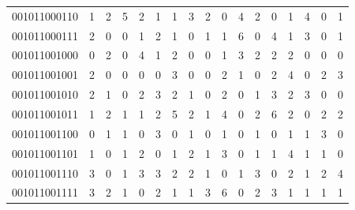 \documentclass[10pt,a4paper]{article}
\begin{document}
\begin{longtable}{ |c|c|c|c|c|c|c|c|c|c|c|c|c|c|c|c|c| }
    001011000110              & 1                            & 2                                & 5                            & 2                              & 1   & 1   & 3   & 2   & 0   & 4   & 2   & 0   & 1   & 4   & 0   & 1   \\
    001011000111              & 2                            & 0                                & 0                            & 1                              & 2   & 1   & 0   & 1   & 1   & 6   & 0   & 4   & 1   & 3   & 0   & 1   \\
    001011001000              & 0                            & 2                                & 0                            & 4                              & 1   & 2   & 0   & 0   & 1   & 3   & 2   & 2   & 2   & 0   & 0   & 0   \\
    001011001001              & 2                            & 0                                & 0                            & 0                              & 0   & 3   & 0   & 0   & 2   & 1   & 0   & 2   & 4   & 0   & 2   & 3   \\
    001011001010              & 2                            & 1                                & 0                            & 2                              & 3   & 2   & 1   & 0   & 2   & 0   & 1   & 3   & 2   & 3   & 0   & 0   \\
    001011001011              & 1                            & 2                                & 1                            & 1                              & 2   & 5   & 2   & 1   & 4   & 0   & 2   & 6   & 2   & 0   & 2   & 2   \\
    001011001100              & 0                            & 1                                & 1                            & 0                              & 3   & 0   & 1   & 0   & 1   & 0   & 1   & 0   & 1   & 1   & 3   & 0   \\
    001011001101              & 1                            & 0                                & 1                            & 2                              & 0   & 1   & 2   & 1   & 3   & 0   & 1   & 1   & 4   & 1   & 1   & 0   \\
    001011001110              & 3                            & 0                                & 1                            & 3                              & 3   & 2   & 2   & 1   & 0   & 1   & 3   & 0   & 2   & 1   & 2   & 4   \\
    001011001111              & 3                            & 2                                & 1                            & 0                              & 2   & 1   & 1   & 3   & 6   & 0   & 2   & 3   & 1   & 1   & 1   & 1   \\

\end{longtable}
\end{document}
